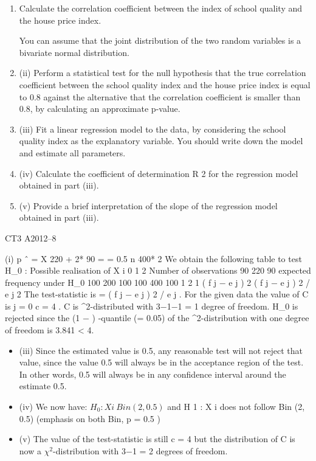 \documentclass[a4paper,12pt]{article}
\begin{document}
\begin{enumerate}
\item Calculate the correlation coefficient between the index of school quality and
the house price index.

You can assume that the joint distribution of the two random variables is a bivariate
normal distribution.
\item (ii) Perform a statistical test for the null hypothesis that the true correlation
coefficient between the school quality index and the house price index is
equal to 0.8 against the alternative that the correlation coefficient is smaller
than 0.8, by calculating an approximate p-value.
\item 
(iii) Fit a linear regression model to the data, by considering the school quality
index as the explanatory variable. You should write down the model and
estimate all parameters.
\item 
(iv) Calculate the coefficient of determination R 2 for the regression model
obtained in part (iii).
\item (v)
Provide a brief interpretation of the slope of the regression model obtained in
part (iii).
\end{enumerate}


CT3 A2012–8


\newpage
(i)
p ˆ =
X 220 + 2* 90
=
= 0.5
n
400* 2
We obtain the following table to test H_{0} :
Possible realisation of X i 0 1 2
Number of observations 90 220 90
expected frequency under H_{0} 100 200 100
100 400 100
1 2 1
( f j − e j ) 2
( f j − e j ) 2 / e j
2
The test-statistic is = \sum ( f j − e j ) 2 / e j . For the given data the value of C is
j = 0
c = 4 .
C is \chi^2-distributed with 3−1−1 = 1 degree of freedom.
H_{0} is rejected since the (1 − \alpha ) -quantile (\alpha = 0.05) of the \chi^2-distribution with
one degree of freedom is 3.841 < 4.
\begin{itemize}
    \item (iii) Since the estimated value is 0.5, any reasonable test will not reject that value,
since the value 0.5 will always be in the acceptance region of the test. In other
words, 0.5 will always be in any confidence interval around the estimate 0.5.
\item (iv) We now have: $H_{0} : X i ~ Bin (2, 0.5)$ and
H 1 : X i does not follow Bin (2, 0.5) (emphasis on both Bin, p = 0.5 )
\item (v)
The value of the test-statistic is still c = 4 but the distribution of C is now a
$\chi^2$-distribution with 3−1 = 2 degrees of freedom.
\end{itemize}
\end{document}
